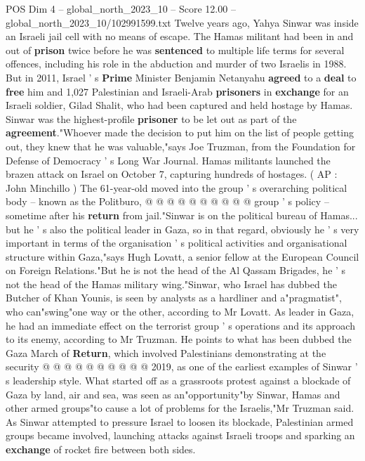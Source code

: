 \begin{textsample}{POS Dim 4 – global\_north\_2023\_10 – Score 12.00 – global\_north\_2023\_10/102991599.txt}  \label{ex:f4_pos_445}
Twelve years ago, Yahya Sinwar was inside an Israeli jail cell with no means of escape.
The Hamas militant had been in and out of \textbf{prison} twice before he was \textbf{sentenced} to multiple life terms for several offences, including his role in the abduction and murder of two Israelis in 1988.
But in 2011, Israel ' s \textbf{Prime} Minister Benjamin Netanyahu \textbf{agreed} to a \textbf{deal} to \textbf{free} him and 1,027 Palestinian and Israeli-Arab \textbf{prisoners} in \textbf{exchange} for an Israeli soldier, Gilad Shalit, who had been captured and held hostage by Hamas.
Sinwar was the highest-profile \textbf{prisoner} to be let out as part of the \textbf{agreement}."Whoever made the decision to put him on the list of people getting out, they knew that he was valuable,"says Joe Truzman, from the Foundation for Defense of Democracy ' s Long War Journal.
Hamas militants launched the brazen attack on Israel on October 7, capturing hundreds of hostages. ( AP : John Minchillo ) The 61-year-old moved into the group ' s overarching political body -- known as the Politburo, @ @ @ @ @ @ @ @ @ @ group ' s policy -- sometime after his \textbf{return} from jail."Sinwar is on the political bureau of Hamas... but he ' s also the political leader in Gaza, so in that regard, obviously he ' s very important in terms of the organisation ' s political activities and organisational structure within Gaza,"says Hugh Lovatt, a senior fellow at the European Council on Foreign Relations."But he is not the head of the Al Qassam Brigades, he ' s not the head of the Hamas military wing."Sinwar, who Israel has dubbed the Butcher of Khan Younis, is seen by analysts as a hardliner and a"pragmatist", who can"swing"one way or the other, according to Mr Lovatt.
As leader in Gaza, he had an immediate effect on the terrorist group ' s operations and its approach to its enemy, according to Mr Truzman.
He points to what has been dubbed the Gaza March of \textbf{Return}, which involved Palestinians demonstrating at the security @ @ @ @ @ @ @ @ @ @ 2019, as one of the earliest examples of Sinwar ' s leadership style.
What started off as a grassroots protest against a blockade of Gaza by land, air and sea, was seen as an"opportunity"by Sinwar, Hamas and other armed groups"to cause a lot of problems for the Israelis,"Mr Truzman said.
As Sinwar attempted to pressure Israel to loosen its blockade, Palestinian armed groups became involved, launching attacks against Israeli troops and sparking an \textbf{exchange} of rocket fire between both sides.

\end{textsample}
